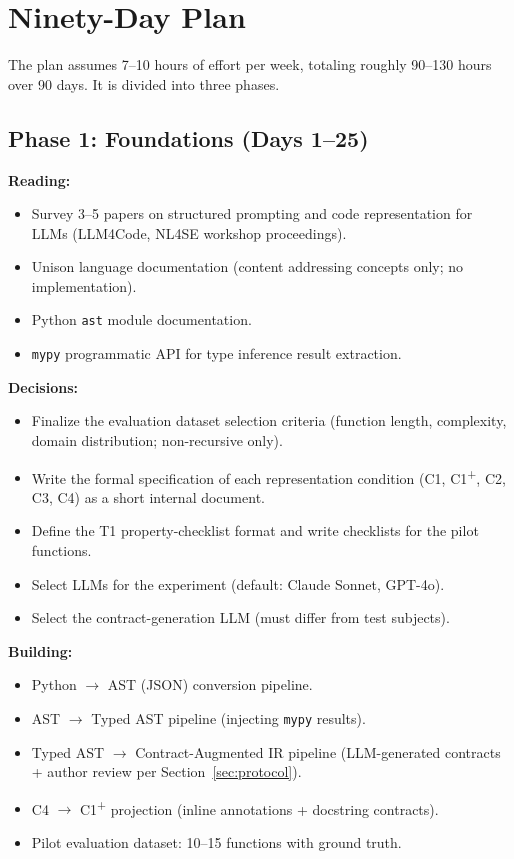 \documentclass[11pt]{article}
\begin{document}
\section{Ninety-Day Plan}
\label{sec:plan}

The plan assumes 7--10 hours of effort per week, totaling roughly
90--130 hours over 90 days.  It is divided into three phases.

\subsection*{Phase 1: Foundations (Days 1--25)}

\textbf{Reading:}
\begin{itemize}
  \item Survey 3--5 papers on structured prompting and code
        representation for LLMs (LLM4Code, NL4SE workshop proceedings).
  \item Unison language documentation (content addressing concepts
        only; no implementation).
  \item Python \texttt{ast} module documentation.
  \item \texttt{mypy} programmatic API for type inference result
        extraction.
\end{itemize}

\textbf{Decisions:}
\begin{itemize}
  \item Finalize the evaluation dataset selection criteria (function
        length, complexity, domain distribution; non-recursive only).
  \item Write the formal specification of each representation
        condition (C1, C1\textsuperscript{+}, C2, C3, C4) as a short
        internal document.
  \item Define the T1 property-checklist format and write checklists
        for the pilot functions.
  \item Select LLMs for the experiment (default: Claude Sonnet, GPT-4o).
  \item Select the contract-generation LLM (must differ from test
        subjects).
\end{itemize}

\textbf{Building:}
\begin{itemize}
  \item Python $\to$ AST (JSON) conversion pipeline.
  \item AST $\to$ Typed AST pipeline (injecting \texttt{mypy} results).
  \item Typed AST $\to$ Contract-Augmented IR pipeline (LLM-generated
        contracts + author review per Section~\ref{sec:protocol}).
  \item C4 $\to$ C1\textsuperscript{+} projection (inline annotations
        + docstring contracts).
  \item Pilot evaluation dataset: 10--15 functions with ground truth.
\end{itemize}
\end{document}
